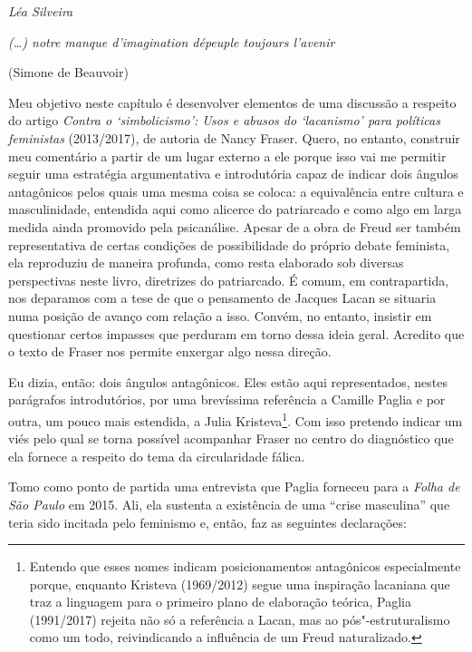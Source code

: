 

\begin{flushright}
\emph{Léa Silveira}
\end{flushright}

\epigraph{\emph{(\ldots{}) notre manque d'imagination dépeuple toujours l'avenir}}{(Simone de Beauvoir)}

Meu objetivo neste capítulo é desenvolver elementos de uma discussão a
respeito do artigo \emph{Contra o `simbolicismo': Usos e abusos do
`lacanismo' para políticas feministas} (2013/2017), de autoria de Nancy
Fraser. Quero, no entanto, construir meu comentário a partir de um lugar
externo a ele porque isso vai me permitir seguir uma estratégia
argumentativa e introdutória capaz de indicar dois ângulos antagônicos
pelos quais uma mesma coisa se coloca: a equivalência entre cultura e
masculinidade, entendida aqui como alicerce do patriarcado e como algo
em larga medida ainda promovido pela psicanálise. Apesar de a obra de
Freud ser também representativa de certas condições de possibilidade do
próprio debate feminista, ela reproduziu de maneira profunda, como resta
elaborado sob diversas perspectivas neste livro, diretrizes do
patriarcado. É comum, em contrapartida, nos deparamos com a tese de que
o pensamento de Jacques Lacan se situaria numa posição de avanço com
relação a isso. Convém, no entanto, insistir em questionar certos
impasses que perduram em torno dessa ideia geral. Acredito que o texto
de Fraser nos permite enxergar algo nessa direção.

Eu dizia, então: dois ângulos antagônicos. Eles estão aqui
representados, nestes parágrafos introdutórios, por uma brevíssima
referência a Camille Paglia e por outra, um pouco mais estendida, a
Julia Kristeva\footnote{Entendo que esses nomes indicam posicionamentos
  antagônicos especialmente porque, enquanto Kristeva (1969/2012) segue
  uma inspiração lacaniana que traz a linguagem para o primeiro plano de
  elaboração teórica, Paglia (1991/2017) rejeita não só a referência a
  Lacan, mas ao pós"-estruturalismo como um todo, reivindicando a
  influência de um Freud naturalizado.}. Com isso pretendo indicar um
viés pelo qual se torna possível acompanhar Fraser no centro do
diagnóstico que ela fornece a respeito do tema da circularidade fálica.

Tomo como ponto de partida uma entrevista que Paglia forneceu para a
\emph{Folha de São Paulo} em 2015. Ali, ela sustenta a existência de uma
``crise masculina'' que teria sido incitada pelo feminismo e, então, faz
as seguintes declarações:

